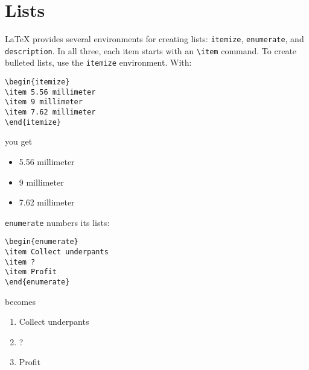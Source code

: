\section{Lists}

\LaTeX{} provides several environments for creating lists:
\texttt{itemize}, \texttt{enumerate}, and \texttt{description}.
In all three, each item starts with an \verb|\item| command.
To create bulleted lists, use the \texttt{itemize} environment.
With:
\begin{leftfigure}
\begin{lstlisting}
\begin{itemize}
\item 5.56 millimeter
\item 9 millimeter
\item 7.62 millimeter
\end{itemize}
\end{lstlisting}
\end{leftfigure}
you get
\begin{leftfigure}
\lm%
\begin{itemize}[leftmargin=*]
\item 5.56 millimeter
\item 9 millimeter
\item 7.62 millimeter
\end{itemize}
\end{leftfigure}

\bigskip
\noindent \texttt{enumerate} numbers its lists:
\begin{leftfigure}
\begin{lstlisting}
\begin{enumerate}
\item Collect underpants
\item ?
\item Profit
\end{enumerate}
\end{lstlisting}
\end{leftfigure}
becomes
\begin{leftfigure}
\lm%
\begin{enumerate}[leftmargin=*]
\item Collect underpants
\item ?
\item Profit
\end{enumerate}
\end{leftfigure}


